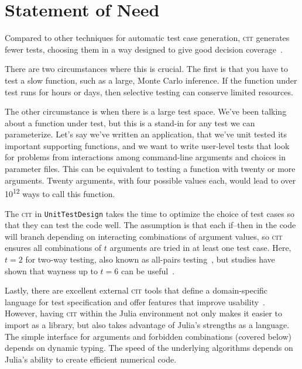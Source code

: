 \documentclass{juliacon}
\newcommand{\utd}{\texttt{UnitTestDesign}\xspace}
\newcommand{\cit}{\textsc{cit}\xspace}
\begin{document}
\section{Statement of Need}\label{sec:statement-of-need}

Compared to other techniques for automatic test case generation, \cit generates fewer tests, choosing them in a way designed to give good decision coverage~\cite{Nie2011-yl,Grindal2005-su,Kuhn2010-ak}.

\vskip 6pt
There are two circumstances where this is crucial. The first is that you have to test a slow function, such as a large, Monte Carlo inference. If the function under test runs for hours or days, then selective testing can conserve limited resources.

\vskip 6pt
The other circumstance is when there is a large test space. We've been talking about a function under test, but this is a stand-in for any test we can parameterize. Let's say we've written an application, that we've unit tested its important supporting functions, and we want to write user-level tests that look for problems from interactions among command-line arguments and choices in parameter files. This can be equivalent to testing a function with twenty or more arguments. Twenty arguments, with four possible values each, would lead to over 10\textsuperscript{12} ways to call this function.

\vskip 6pt
The \cit in \utd takes the time to optimize the choice of test cases so that they can test the code well. The assumption is that each if--then in the code will branch depending on interacting combinations of argument values, so \cit ensures all combinations of $t$ arguments are tried in at least one test case. Here, $t=2$ for two-way testing, also known as all-pairs testing~\cite{pairwise-website}, but studies have shown that wayness up to $t=6$ can be useful~\cite{Petke2015-ex}.

\vskip 6pt
Lastly, there are excellent external \cit tools that define a domain-specific language for test specification and offer features that improve usability~\cite{Czerwonka2006-hm,Kuhn2010-ak}. However, having \cit within the Julia environment not only makes it easier to import as a library, but also takes advantage of Julia's strengths as a language. The simple interface for arguments and forbidden combinations (covered below) depends on dynamic typing. The speed of the underlying algorithms depends on Julia's ability to create efficient numerical code.
\end{document}
